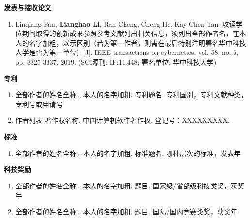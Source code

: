 \begin{publications}
\noindent
\textbf{发表与接收论文}
\renewcommand{\labelenumi}{[\arabic{enumi}]}
\begin{enumerate}
\item Linqiang Pan, \textbf{Lianghao Li}, Ran Cheng, Cheng He, Kay Chen Tan. 攻读学位期间取得的创新成果参照参考文献列出相关信息，须列出全部作者名，在本人的名字加粗，以示区别（若为第一作者，则需在最后特别注明署名华中科技大学是否为第一单位）[J]. IEEE transactions on cybernetics, vol. 58, no. 6, pp. 3325-3337, 2019. (SCI源刊; IF:11.448; 署名单位: 华中科技大学)
\end{enumerate}
\textbf{专利}
\renewcommand{\labelenumi}{[\arabic{enumi}]}
\begin{enumerate}
\item 全部作者的姓名全称，本人的名字加粗. 专利题名. 专利国别，专利文献种类，专利号或申请号
\item 作者列表 著作权名称. 中国计算机软件著作权. 登记号：XXXXXXXXX.
\end{enumerate}
\textbf{标准}
\renewcommand{\labelenumi}{[\arabic{enumi}]}
\begin{enumerate}
\item 全部作者的姓名全称，本人的名字加粗. 标准题名. 哪种层次的标准，发表年
\end{enumerate}
\textbf{科技奖励}
\renewcommand{\labelenumi}{[\arabic{enumi}]}
\begin{enumerate}
\item 全部作者的姓名全称，本人的名字加粗. 题目. 国家级/省部级科技类奖，获奖年
\item 全部作者的姓名全称，本人的名字加粗. 题目. 国际/国内竞赛类奖，获奖年
\end{enumerate}
\end{publications}
